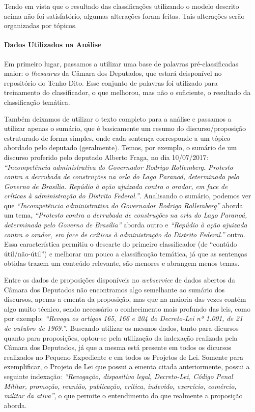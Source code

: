 Tendo em vista que o resultado das classificações utilizando o modelo descrito acima não foi satisfatório, algumas alterações foram feitas. Tais alterações serão organizadas por tópicos.

\paragraph{Dados Utilizados na Análise}

Em primeiro lugar, passamos a utilizar uma base de palavras pré-classificadas maior: o \textit{thesaurus} da Câmara dos Deputados, que estará deisponível no repositório do Tenho Dito. Esse conjunto de palavras foi utilizado para treinamento do classificador, o que melhorou, mas não o suficiente, o resultado da classificação temática.

Também deixamos de utilizar o texto completo para a análise e passamos a utilizar apenas o sumário, que é basicamente um resumo do discurso/proposição estruturado de forma simples, onde cada sentença corresponde a um tópico abordado pelo deputado (geralmente). Temos, por exemplo, o sumário de um discurso proferido pelo deputado Alberto Fraga, no dia 10/07/2017: \textit{``Incompetência administrativa do Governador Rodrigo Rollemberg. Protesto contra a derrubada de construções na orla do Lago Paranoá, determinada pelo Governo de Brasília. Repúdio à ação ajuizada contra o orador, em face de críticas à administração do Distrito Federal.''}. Analisando o sumário, podemos ver que \textit{``Incompetência administrativa do Governador Rodrigo Rollemberg''} aborda um tema, \textit{``Protesto contra a derrubada de construções na orla do Lago Paranoá, determinada pelo Governo de Brasília''} aborda outro e \textit{``Repúdio à ação ajuizada contra o orador, em face de críticas à administração do Distrito Federal.''} outro. Essa característica permitiu o descarte do primeiro classificador (de ``contúdo útil/não-útil'') e melhorar um pouco a classificação temática, já que as sentenças obtidas trazem um conteúdo relevante, são menores e abrangem menos temas.

Entre os dados de proposições disponíveis no \textit{webservice} de dados abertos da Câmara dos Deputados não encontramos algo semelhante ao sumário dos discursos, apenas a ementa da proposição, mas que na maioria das vezes contém algo muito técnico, sendo necessário o conhecimento mais profundo das leis, como por exemplo: \textit{``Revoga os artigos 165, 166 e 204 do Decreto-Lei nº 1.001, de 21 de outubro de 1969.''}. Buscando utilizar os mesmos dados, tanto para dicursos quanto para proposições, optou-se pela utilização da indexação realizada pela Câmara dos Deputados, já que a mesma está presente em todos os dicursos realizados no Pequeno Expediente e em todos os Projetos de Lei. Somente para exemplificar, o Projeto de Lei que possui a ementa citada anteriormente, possui a seguinte indexação: \textit{``Revogação, dispositivo legal, Decreto-Lei, Código Penal Militar, promoção, reunião, publicação, crítica, indevido, exercício, comércio, militar da ativa''}, o que permite o entendimento do que realmente a proposição aborda.

